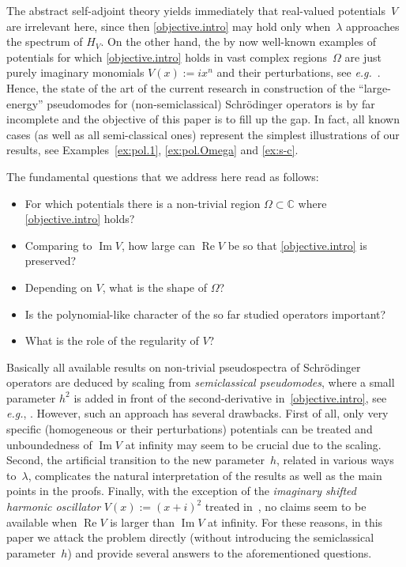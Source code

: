 {The abstract self-adjoint theory yields immediately 
that real-valued potentials~$V$ are irrelevant here, 
since then \eqref{objective.intro} may hold 
only when~$\lambda$ approaches the spectrum of $H_V$.
On the other hand, the by now well-known examples of 
potentials for which \eqref{objective.intro} holds in 
vast complex regions~$\Omega$ are just purely imaginary 
monomials $V(x):=i x^n$ and their perturbations, 
see {\emph{e.g.}}~\cite{Davies_1999-NSA, Boulton_2002,  
Pravda-Starov_2006, SK, KSTV, Novak-2015-54}. 
Hence, the state of the art of the current research
in construction of the ``large-energy'' pseudomodes 
for (non-semiclassical) Schr\"odinger operators
is by far incomplete and the objective of this paper 
is to fill up the gap. In fact, all known cases 
(as well as all semi-classical ones) represent the simplest 
illustrations of our results, 
see Examples~\ref{ex:pol.1}, \ref{ex:pol.Omega} and \ref{ex:s-c}. 

The fundamental questions that we address here read as follows: 
\begin{itemize}
\item For which potentials there is 
a non-trivial region $\Omega \subset {\mathbb{C}}$ where \eqref{objective.intro} holds?
\item Comparing to ${\operatorname{Im}} V$,  how large can ${\operatorname{Re}} V$ be 
so that \eqref{objective.intro} is preserved?
\item Depending on $V$, what is the shape of $\Omega$?
\item Is the polynomial-like character of the so far studied operators important?
\item What is the role of the regularity of $V$? 
\end{itemize}

Basically all available results 
on non-trivial pseudospectra of Schr\"odinger operators 
are deduced by scaling 	from \emph{semiclassical pseudomodes},
where a small parameter $h^2$ is added in front of the second-derivative
in~\eqref{objective.intro}, 
see {\emph{e.g.}}, \cite{Davies_1999-NSA,Dencker-Sjostrand-Zworski_2004}.
However, such an approach has several drawbacks. 
First of all, only very specific (homogeneous or their perturbations) 
potentials can be treated and unboundedness of ${\operatorname{Im}} V$ 
at infinity may seem to be crucial due to the scaling.
Second, the artificial transition to the new parameter~$h$, 
related in various ways to~$\lambda$, 
complicates the natural interpretation of the results 
as well as the main points in the proofs.
Finally, with the exception of 
the \emph{imaginary shifted harmonic oscillator} 
$V(x):=(x+i)^2$ treated in~\cite{KSTV}, 
no claims seem to be available when ${\operatorname{Re}} V$ is larger than ${\operatorname{Im}} V$ at infinity.  
For these reasons, in this paper
we attack the problem directly 
(without introducing the semiclassical parameter~$h$)
and provide several answers to the aforementioned questions. 

}
